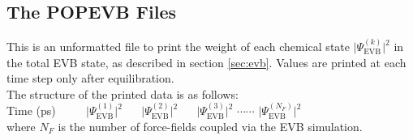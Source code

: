 \subsection{The POPEVB Files}\label{sec:evbpop}
This is an unformatted file to print the weight of each chemical state $|\Psi^{(k)}_{\text{EVB}}\big|^{2}$ in the total EVB state, as described in section \ref{sec:evb}. Values are printed at each time step only after equilibration.\\ 
The structure of the printed data is as follows:\\

Time (ps)  $\,\,\,\,\,\,\,\,\,\,\,\,$    $|\Psi^{(1)}_{\text{EVB}}\big|^{2}$ $\,\,\,\,\,\,$    $|\Psi^{(2)}_{\text{EVB}}\big|^{2}$  $\,\,\,\,\,\,$    $|\Psi^{(3)}_{\text{EVB}}\big|^{2}$ $\cdots\cdots$    $|\Psi^{(N_F)}_{\text{EVB}}\big|^{2}$\\

where $N_F$ is the number of force-fields coupled via the EVB simulation. 
